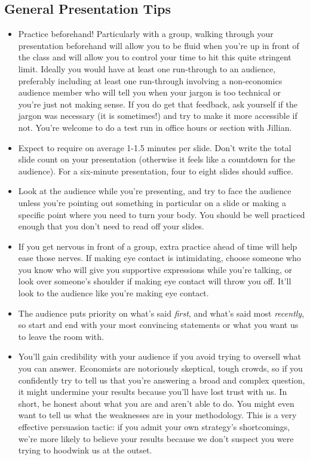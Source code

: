 \subsection{General Presentation Tips}
\begin{itemize}
    \item Practice beforehand! Particularly with a group, walking through your presentation beforehand will allow you to be fluid when you're up in front of the class and will allow you to control your time to hit this quite stringent limit. Ideally you would have at least one run-through to an audience, preferably including at least one run-through involving a non-economics audience member who will tell you when your jargon is too technical or you're just not making sense. If you do get that feedback, ask yourself if the jargon was necessary (it is sometimes!) and try to make it more accessible if not. You're welcome to do a test run in office hours or section with Jillian.
    \item Expect to require on average 1-1.5 minutes per slide. Don't write the total slide count on your presentation (otherwise it feels like a countdown for the audience). For a six-minute presentation, four to eight slides should suffice. 
    \item Look at the audience while you're presenting, and try to face the audience unless you're pointing out something in particular on a slide or making a specific point where you need to turn your body. You should be well practiced enough that you don't need to read off your slides. 
    \item If you get nervous in front of a group, extra practice ahead of time will help ease those nerves. If making eye contact is intimidating, choose someone who you know who will give you supportive expressions while you're talking, or look over someone's shoulder if making eye contact will throw you off. It'll look to the audience like you're making eye contact.
    \item The audience puts priority on what's said \textit{first}, and what's said most \textit{recently}, so start and end with your most convincing statements or what you want us to leave the room with.
    \item You'll gain credibility with your audience if you avoid trying to oversell what you can answer. Economists are notoriously skeptical, tough crowds, so if you confidently try to tell us that you're answering a broad and complex question, it might undermine your results because you'll have lost trust with us. In short, be honest about what you are and aren't able to do. You might even want to tell us what the weaknesses are in your methodology. This is a very effective persuasion tactic: if you admit your own strategy's shortcomings, we're more likely to believe your results because we don't suspect you were trying to hoodwink us at the outset.

\end{itemize}
